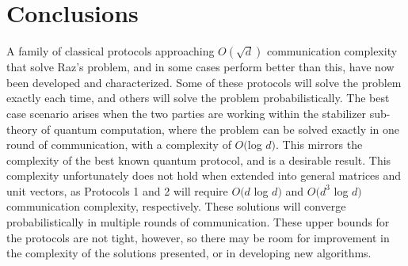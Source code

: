 \documentclass[../3Wworkreport.tex]{subfiles}
\begin{document}
\section{Conclusions}
\label{sec:conclusions}

A family of classical protocols approaching $O(\sqrt{d})$ communication complexity that solve Raz\rq{}s problem, and in some cases perform better than this, have now been developed and characterized. Some of these protocols will solve the problem exactly each time, and others will solve the problem probabilistically. The best case scenario arises when the two parties are working within the stabilizer sub-theory of quantum computation, where the problem can be solved exactly in one round of communication, with a complexity of $O($log $d)$. This mirrors the complexity of the best known quantum protocol, and is a desirable result. This complexity unfortunately does not hold when extended into general matrices and unit vectors, as Protocols 1 and 2 will require $O(d$ log $d)$ and $O(d^3$ log $d)$ communication complexity, respectively. These solutions will converge probabilistically in multiple rounds of communication. These upper bounds for the protocols are not tight, however, so there may be room for improvement in the complexity of the solutions presented, or in developing new algorithms.
\end{document}
